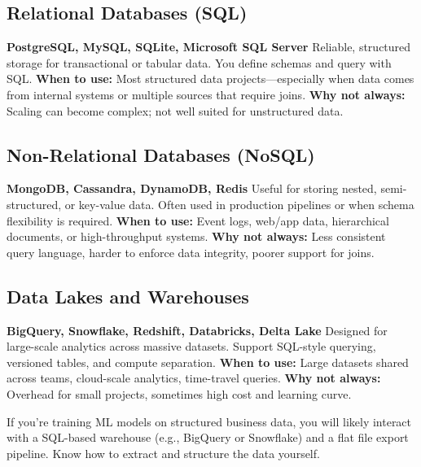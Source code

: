\documentclass[12pt,openany, draft]{book}
\begin{document}
\subsection*{Relational Databases (SQL)}

\textbf{PostgreSQL, MySQL, SQLite, Microsoft SQL Server} \newline
Reliable, structured storage for transactional or tabular data. You define schemas and query with SQL. \newline
\textbf{When to use:} Most structured data projects—especially when data comes from internal systems or multiple sources that require joins. \newline
\textbf{Why not always:} Scaling can become complex; not well suited for unstructured data.

\subsection*{Non-Relational Databases (NoSQL)}

\textbf{MongoDB, Cassandra, DynamoDB, Redis} \newline
Useful for storing nested, semi-structured, or key-value data. Often used in production pipelines or when schema flexibility is required. \newline
\textbf{When to use:} Event logs, web/app data, hierarchical documents, or high-throughput systems. \newline
\textbf{Why not always:} Less consistent query language, harder to enforce data integrity, poorer support for joins.

\subsection*{Data Lakes and Warehouses}

\textbf{BigQuery, Snowflake, Redshift, Databricks, Delta Lake} \newline
Designed for large-scale analytics across massive datasets. Support SQL-style querying, versioned tables, and compute separation. \newline
\textbf{When to use:} Large datasets shared across teams, cloud-scale analytics, time-travel queries. \newline
\textbf{Why not always:} Overhead for small projects, sometimes high cost and learning curve.

\begin{notebox}
If you're training ML models on structured business data, you will likely interact with a SQL-based warehouse (e.g., BigQuery or Snowflake) and a flat file export pipeline. Know how to extract and structure the data yourself.
\end{notebox}
\end{document}
